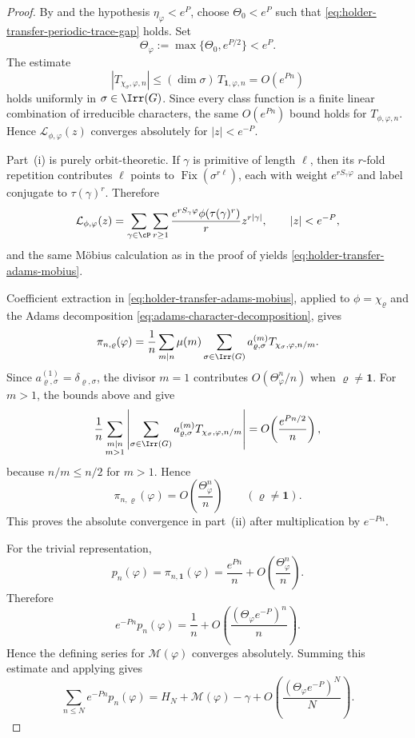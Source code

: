 \begin{proof}
  By  and the
  hypothesis \(\eta_\varphi<e^P\), choose \(\Theta_0<e^P\) such that
  \eqref{eq:holder-transfer-periodic-trace-gap} holds.
  Set
  \[
    \Theta_\varphi:=\max\{\Theta_0,e^{P/2}\}<e^P.
  \]
  The estimate
  \[
    |T_{\chi_\sigma,\varphi,n}|
    \le (\dim\sigma)\,T_{\mathbf 1,\varphi,n}
    =O(e^{Pn})
  \]
  holds uniformly in \(\sigma\in\Irr(G)\). Since every class function is
  a finite linear combination of irreducible characters, the same
  \(O(e^{Pn})\) bound holds for \(T_{\phi,\varphi,n}\). Hence
  \(\mathcal L_{\phi,\varphi}(z)\) converges absolutely for
  \(|z|<e^{-P}\).

  Part~\textup{(i)} is purely orbit-theoretic. If \(\gamma\) is
  primitive of length \(\ell\), then its \(r\)-fold repetition
  contributes \(\ell\) points to \(\operatorname{Fix}(\sigma^{r\ell})\),
  each with weight \(e^{rS_\gamma\varphi}\) and label conjugate to
  \(\tau(\gamma)^r\). Therefore
  \[
    \mathcal L_{\phi,\varphi}(z)
    =
    \sum_{\gamma\in\cP}\sum_{r\ge 1}
      \frac{e^{rS_\gamma\varphi}\phi(\tau(\gamma)^r)}{r}z^{r|\gamma|},
    \qquad |z|<e^{-P},
  \]
  and the same M\"obius calculation as in the proof of
   yields
  \eqref{eq:holder-transfer-adams-mobius}.

  Coefficient extraction in
  \eqref{eq:holder-transfer-adams-mobius}, applied to
  \(\phi=\chi_\varrho\) and the Adams decomposition
  \eqref{eq:adams-character-decomposition}, gives
  \[
    \pi_{n,\varrho}(\varphi)
    =
    \frac{1}{n}\sum_{m\mid n}\mu(m)
      \sum_{\sigma\in\Irr(G)}
        a_{\varrho,\sigma}^{(m)}T_{\chi_\sigma,\varphi,n/m}.
  \]
  Since \(a_{\varrho,\sigma}^{(1)}=\delta_{\varrho,\sigma}\), the
  divisor \(m=1\) contributes \(O(\Theta_\varphi^n/n)\) when
  \(\varrho\neq\mathbf 1\). For \(m>1\), the bounds above and
   give
  \[
    \frac{1}{n}
    \sum_{\substack{m\mid n\\ m>1}}
      \left|
        \sum_{\sigma\in\Irr(G)}
          a_{\varrho,\sigma}^{(m)}T_{\chi_\sigma,\varphi,n/m}
      \right|
    =
    O\!\left(\frac{e^{Pn/2}}{n}\right),
  \]
  because \(n/m\le n/2\) for \(m>1\). Hence
  \[
    \pi_{n,\varrho}(\varphi)
    =O\!\left(\frac{\Theta_\varphi^n}{n}\right)
    \qquad (\varrho\neq\mathbf 1).
  \]
  This proves the absolute convergence in part~\textup{(ii)} after
  multiplication by \(e^{-Pn}\).

  For the trivial representation,
  \[
    p_n(\varphi)=\pi_{n,\mathbf 1}(\varphi)
    =
    \frac{e^{Pn}}{n}+O\!\left(\frac{\Theta_\varphi^n}{n}\right).
  \]
  Therefore
  \[
    e^{-Pn}p_n(\varphi)
    =
    \frac{1}{n}+O\!\left(\frac{(\Theta_\varphi e^{-P})^n}{n}\right).
  \]
  Hence the defining series for \(\mathcal M(\varphi)\) converges
  absolutely. Summing this estimate and applying
   gives
  \[
    \sum_{n\le N}e^{-Pn}p_n(\varphi)
    =
    H_N+\mathcal M(\varphi)-\gamma
    +O\!\left(\frac{(\Theta_\varphi e^{-P})^N}{N}\right).
  \]


\end{proof}
